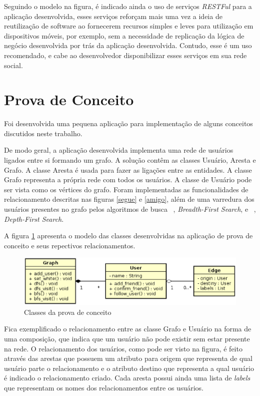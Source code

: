 Seguindo o modelo na figura, é indicado ainda o uso de serviços \textit{RESTFul} para a aplicação desenvolvida, esses serviços reforçam mais uma vez a ideia de reutilização de software ao fornecerem recursos simples e leves para utilização em dispositivos móveis, por exemplo, sem a necessidade de replicação da lógica de negócio desenvolvida por trás da aplicação desenvolvida. Contudo, esse é um uso recomendado, e cabe ao desenvolvedor disponibilizar esses serviços em sua rede social.

\section{Prova de Conceito}

Foi desenvolvida uma pequena aplicação para implementação de alguns conceitos discutidos neste trabalho.

De modo geral, a aplicação desenvolvida implementa uma rede de usuários ligados entre si formando um grafo. A solução contêm as classes Usuário, Aresta e Grafo. A classe Aresta é usada para fazer as ligações entre as entidades. A classe Grafo representa a própria rede com todos os usuários. A classe de Usuário pode ser vista como os vértices do grafo. Foram implementadas as funcionalidades de relacionamento descritas nas figuras \ref{segue} e \ref{amigo}, além de uma varredura dos usuários presentes no grafo pelos algoritmos de busca ~, \textit{Breadth-First Search}, e ~, \textit{Depth-First Search}.

A figura \ref{modelo prova de conceito} apresenta o modelo das classes desenvolvidas na aplicação de prova de conceito e seus repectivos relacionamentos.

\begin{figure}[!h]
	\centering
	\includegraphics[scale=0.8]{figuras/capitulo5/classes_prova_conceito.eps}
	\caption{Classes da prova de conceito}
	\label{modelo prova de conceito}
\end{figure}

Fica exemplificado o relacionamento entre as classe Grafo e Usuário na forma de uma composição, que indica que um usuário não pode existir sem estar presente na rede. O relacionamento dos usuários, como pode ser visto na figura, é feito através das arestas que possuem um atributo para origem que representa de qual usuário parte o relacionamento e o atributo destino que representa a qual usuário é indicado o relacionamento criado. Cada aresta possui ainda uma lista de \textit{labels} que representam os nomes dos relacionamentos entre os usuários.

